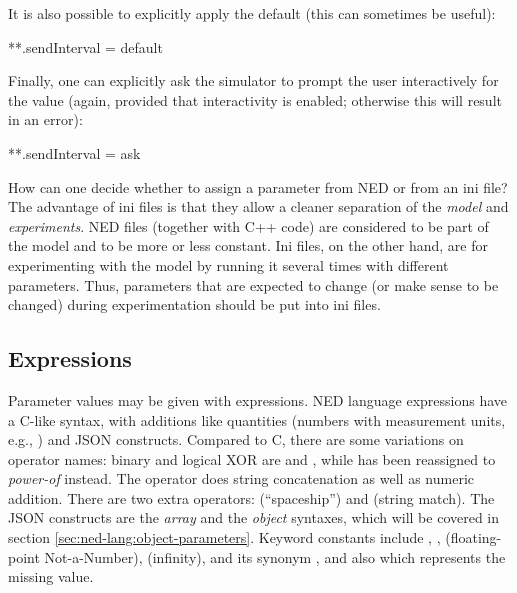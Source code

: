 It is also possible to explicitly apply the default (this can sometimes be useful):

\begin{inifile}
**.sendInterval = default
\end{inifile}

Finally, one can explicitly ask the simulator to prompt the user interactively
for the value (again, provided that interactivity is enabled; otherwise this
will result in an error):

\begin{inifile}
**.sendInterval = ask
\end{inifile}

\begin{note}
    How can one decide whether to assign a parameter from NED or from an ini
    file? The advantage of ini files is that they allow a cleaner separation of
    the \textit{model} and \textit{experiments}. NED files (together with C++
    code) are considered to be part of the model and to be more or less
    constant. Ini files, on the other hand, are for experimenting with the model
    by running it several times with different parameters. Thus, parameters that
    are expected to change (or make sense to be changed) during experimentation
    should be put into ini files.
\end{note}


\subsection{Expressions}
\label{sec:ned-lang:expressions}

Parameter values may be given with expressions. NED language expressions have a
C-like syntax, with additions like quantities (numbers with measurement units,
e.g., ) and JSON constructs. Compared to C, there are some
variations on operator names: binary and logical XOR are \ttt{\#} and
\ttt{\#\#}, while \ttt{\^} has been reassigned to \textit{power-of} instead. The
\ttt{+} operator does string concatenation as well as numeric addition. There
are two extra operators: \ttt{<=>} (``spaceship'') and \ttt{=\~}
(string match). The JSON constructs are the \textit{array} and the
\textit{object} syntaxes, which will be covered in section
\ref{sec:ned-lang:object-parameters}. Keyword constants include ,
,  (floating-point Not-a-Number), 
(infinity),  and its synonym , and also
 which represents the missing value.

